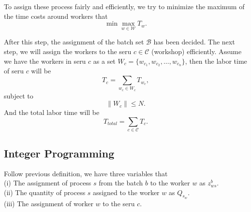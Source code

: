 \documentclass[10pt,reqno]{amsart}
\numberwithin{equation}{section}
\begin{document}
To assign these process fairly and efficiently, we try to minimize the maximum of the time costs around workers that
\begin{equation}\label{loss}
    \min\max_{w\in\mathcal{W}}T_w.
\end{equation}

After this step, the assignment of the batch set $\mathcal{B}$ has been decided. The next step, we will assign the workers to the seru $c\in\mathcal{C}$ (workshop) efficiently. Assume we have the workers in seru $c$ as a set $W_c = \{w_{c_1}, w_{c_2}, \ldots, w_{c_n}\}$, then the labor time of seru $c$ will be 
\begin{equation}\label{cost_c}
    T_c = \sum_{w_c\in W_c} T_{w_c},
\end{equation}
subject to 
\begin{equation}\label{subject_c}
    \|W_c\| \leq N.
\end{equation}
And the total labor time will be
\begin{equation}\label{total}
    T_{total} = \sum_{c\in\mathcal{C}}T_c.
\end{equation}
\subsection{Integer Programming}
Follow previous definition, we have three variables that\\
(i)   The assignment of process $s$ from the batch $b$ to the worker $w$ as $z_{ws}^{b}$.\\
(ii)  The quantity of process $s$ assigned to the worker $w$ as $Q_{s_w}$.\\
(iii) The assignment of worker $w$ to the seru $c$.\\



\end{document}
